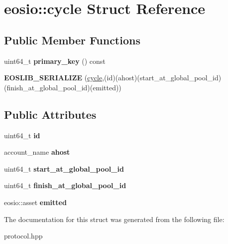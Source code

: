\hypertarget{structeosio_1_1cycle}{}\section{eosio\+:\+:cycle Struct Reference}
\label{structeosio_1_1cycle}
\subsection*{Public Member Functions}
\begin{DoxyCompactItemize}
\item 
\mbox{\label{structeosio_1_1cycle_ad527a4353b708709d776313d6a550038}} 
uint64\+\_\+t {\bfseries primary\+\_\+key} () const
\item 
\mbox{\label{structeosio_1_1cycle_a8f09e7fe00c10d0ee66ffbeb8c82b230}} 
{\bfseries E\+O\+S\+L\+I\+B\+\_\+\+S\+E\+R\+I\+A\+L\+I\+ZE} (\mbox{\hyperlink{structeosio_1_1cycle}{cycle}},(id)(ahost)(start\+\_\+at\+\_\+global\+\_\+pool\+\_\+id)(finish\+\_\+at\+\_\+global\+\_\+pool\+\_\+id)(emitted))
\end{DoxyCompactItemize}
\subsection*{Public Attributes}
\begin{DoxyCompactItemize}
\item 
\mbox{\label{structeosio_1_1cycle_a32ad8c2c5dbc4b6d2cc72c726165ff93}} 
uint64\+\_\+t {\bfseries id}
\item 
\mbox{\label{structeosio_1_1cycle_ae304c9e1596434583f2b1dd80ba9d8cf}} 
account\+\_\+name {\bfseries ahost}
\item 
\mbox{\label{structeosio_1_1cycle_a4a83c4e2b6c1c1a6a29e1c71643efc59}} 
uint64\+\_\+t {\bfseries start\+\_\+at\+\_\+global\+\_\+pool\+\_\+id}
\item 
\mbox{\label{structeosio_1_1cycle_a6619f70ab6b9927bd0133bd7569acd0c}} 
uint64\+\_\+t {\bfseries finish\+\_\+at\+\_\+global\+\_\+pool\+\_\+id}
\item 
\mbox{\label{structeosio_1_1cycle_adc8fa5d9cc298a56e5e5fbb332c197de}} 
eosio\+::asset {\bfseries emitted}
\end{DoxyCompactItemize}


The documentation for this struct was generated from the following file\+:\begin{DoxyCompactItemize}
\item 
protocol.\+hpp\end{DoxyCompactItemize}
